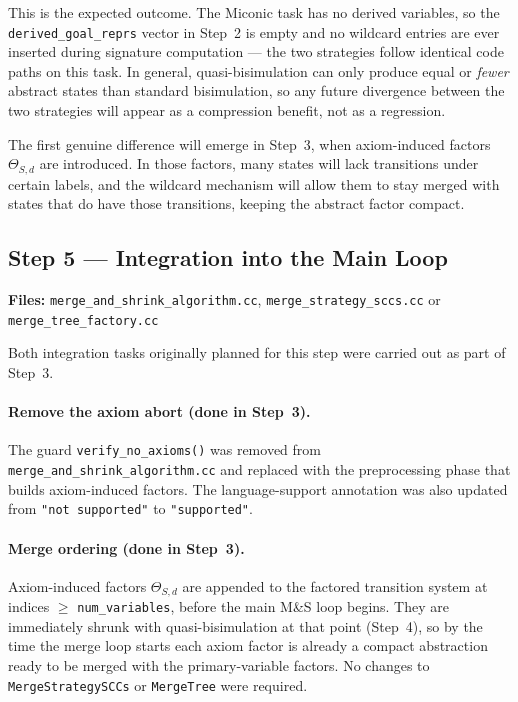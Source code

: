 \documentclass[11pt,a4paper]{article}
\begin{document}
This is the expected outcome.  The Miconic task has no derived variables, so
the \texttt{derived\_goal\_reprs} vector in Step~2 is empty and no wildcard
entries are ever inserted during signature computation --- the two strategies
follow identical code paths on this task.  In general, quasi-bisimulation can
only produce equal or \emph{fewer} abstract states than standard bisimulation,
so any future divergence between the two strategies will appear as a
compression benefit, not as a regression.

The first genuine difference will emerge in Step~3, when axiom-induced factors
$\Theta_{S,d}$ are introduced.  In those factors, many states will lack
transitions under certain labels, and the wildcard mechanism will allow them
to stay merged with states that do have those transitions, keeping the abstract
factor compact.

\subsection{Step 5 — Integration into the Main Loop}
\label{sec:step5}
\textbf{Files:} \texttt{merge\_and\_shrink\_algorithm.cc},
\texttt{merge\_strategy\_sccs.cc} or \texttt{merge\_tree\_factory.cc}

Both integration tasks originally planned for this step were carried out as
part of Step~3.

\paragraph{Remove the axiom abort (done in Step~3).}
The guard \texttt{verify\_no\_axioms()} was removed from
\texttt{merge\_and\_shrink\_algorithm.cc} and replaced with the preprocessing
phase that builds axiom-induced factors.  The language-support annotation was
also updated from \texttt{"not supported"} to \texttt{"supported"}.

\paragraph{Merge ordering (done in Step~3).}
Axiom-induced factors $\Theta_{S,d}$ are appended to the factored transition
system at indices $\geq$ \texttt{num\_variables}, before the main M\&S loop
begins.  They are immediately shrunk with quasi-bisimulation at that point
(Step~4), so by the time the merge loop starts each axiom factor is already a
compact abstraction ready to be merged with the primary-variable factors.  No
changes to \texttt{MergeStrategySCCs} or \texttt{MergeTree} were required.
\end{document}

